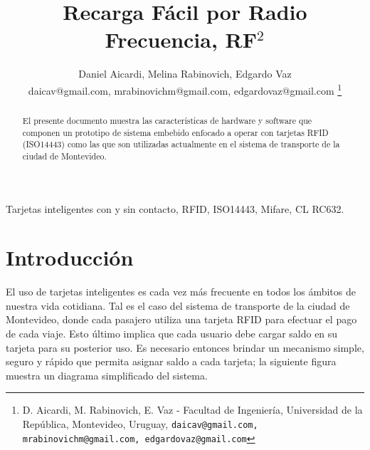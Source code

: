 \documentclass[%
        final,
        notitlepage,
        narroweqnarray,
        inline,
        ]{ieee}
\begin{document}
\title[RF$^{2}$]{%
       Recarga Fácil por Radio Frecuencia, RF$^{2}$}

\author[D. Aicardi, M. Rabinovich, E. Vaz]{Daniel Aicardi, Melina Rabinovich, Edgardo Vaz
		\\daicav@gmail.com, mrabinovichm@gmail.com, edgardovaz@gmail.com
	\thanks{D. Aicardi, M. Rabinovich, E. Vaz - Facultad de Ingeniería, Universidad de la República, Montevideo, Uruguay,
		{\tt\small daicav@gmail.com, mrabinovichm@gmail.com, edgardovaz@gmail.com} }
}





\maketitle               

\begin{abstract}
El presente documento muestra las características de hardware y software que componen un prototipo de sistema embebido enfocado a operar con tarjetas RFID (ISO14443) como las que son utilizadas actualmente en el sistema de transporte de la ciudad de Montevideo.
\end{abstract}


\begin{keywords}
Tarjetas inteligentes con y sin contacto, RFID, ISO14443, Mifare, CL RC632.
\end{keywords}

\section{Introducción}

\PARstart El uso de tarjetas inteligentes es cada vez más frecuente en todos los ámbitos de nuestra vida cotidiana. 
Tal es el caso del sistema de transporte de la ciudad de Montevideo, donde cada pasajero utiliza una tarjeta RFID 
para efectuar el pago de cada viaje. Esto último implica que cada usuario debe cargar saldo en su tarjeta para su 
posterior uso. Es necesario entonces brindar un mecanismo simple, seguro y rápido que permita asignar saldo a cada tarjeta; la siguiente figura muestra un diagrama simplificado del sistema.
\end{document}
